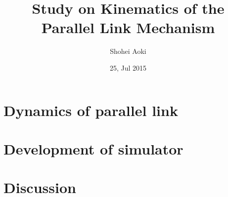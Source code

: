 \documentclass[]{article}
\begin{document}
\title{Study on Kinematics of the Parallel Link Mechanism}
\author{Shohei Aoki}
\date{25, Jul 2015}
\maketitle

\section{Dynamics of parallel link}

\section{Development of simulator}

\section{Discussion}

\nocite{*}

\end{document}
